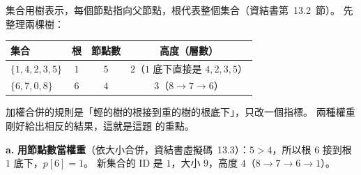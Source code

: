 \begin{pastsoln}
集合用樹表示，每個節點指向父節點，根代表整個集合（資結書第~13.2~節）。 先整理兩棵樹：
\begin{center}
\small
\begin{tabular}{lccc}
\toprule
集合 & 根 & 節點數 & 高度（層數） \\
\midrule
$\{1, 4, 2, 3, 5\}$ & $1$ & $5$ & $2$（$1$ 底下直接是 $4, 2, 3, 5$） \\
$\{6, 7, 0, 8\}$ & $6$ & $4$ & $3$（$8 \to 7 \to 6$） \\
\bottomrule
\end{tabular}
\end{center}
加權合併的規則是「輕的樹的根接到重的樹的根底下」，只改一個指標。 兩種權重剛好給出相反的結果，這就是這題
的重點。

\textbf{a.} \textbf{用節點數當權重}（依大小合併，資結書虛擬碼~13.3）：$5 > 4$，所以根 $6$ 接到根 $1$ 底下，$p[6] = 1$。
新集合的 ID 是 $1$，大小 $9$，高度 $4$（$8 \to 7 \to 6 \to 1$）。


\end{pastsoln}
